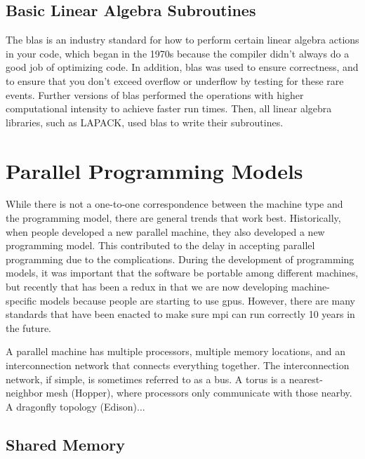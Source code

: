 \documentclass[10pt]{article}
\begin{document}
\begin{flushleft}
\subsection{Basic Linear Algebra Subroutines}

The \gls{blas} is an industry standard for how to perform certain linear algebra actions in your code, which began in the 1970s because the compiler didn't always do a good job of optimizing code. In addition, \gls{blas} was used to ensure correctness, and to ensure that you don't exceed overflow or underflow by testing for these rare events. Further versions of \gls{blas} performed the operations with higher computational intensity to achieve faster run times. Then, all linear algebra libraries, such as LAPACK, used \gls{blas} to write their subroutines.

\section{Parallel Programming Models}

While there is not a one-to-one correspondence between the machine type and the programming model, there are general trends that work best. Historically, when people developed a new parallel machine, they also developed a new programming model. This contributed to the delay in accepting parallel programming due to the complications. During the development of programming models, it was important that the software be portable among different machines, but recently that has been a redux in that we are now developing machine-specific models because people are starting to use \gls{gpu}s. However, there are many standards that have been enacted to make sure \gls{mpi} can run correctly 10 years in the future.  

A parallel machine has multiple processors, multiple memory locations, and an interconnection network that connects everything together. The interconnection network, if simple, is sometimes referred to as a bus. A torus is a nearest-neighbor mesh (Hopper), where processors only communicate with those nearby. A dragonfly topology (Edison)...

\subsection{Shared Memory}


\end{flushleft}
\end{document}
